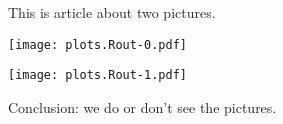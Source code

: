 \documentclass[12pt]{article}
\begin{document}
This is article about two pictures.

\texttt{[image: plots.Rout-0.pdf]}

\texttt{[image: plots.Rout-1.pdf]}

Conclusion: we do or don't see the pictures.
\end{document}
